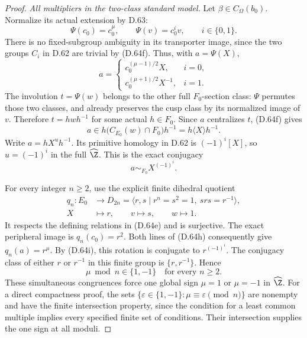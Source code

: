\begin{proof}
\emph{All multipliers in the two-class standard model.}
Let $\beta\in C_\Omega(b_0)$.
Normalize its actual extension by D.63:
\[
        \Psi(c_0)=c_0^\mu,\qquad
        \Psi(v)=c_0^iv,\qquad i\in\{0,1\}.
\]
There is no fixed-subgroup ambiguity in its
transporter image, since the two groups $C_i$
in D.62 are trivial by (D.64f).
Thus, with $a=\Psi(X)$,
\[
       a=
       \begin{cases}
         c_0^{(\mu-1)/2}X,&i=0,\\
         c_0^{(\mu+1)/2}X^{-1},&i=1.
       \end{cases}                                          \tag{D.64h}
\]
The involution $t=\Psi(w)$ belongs to the other
full $F_0$-section class: $\Psi$ permutes those
two classes, and already preserves the cusp
class by its normalized image of $v$.
Therefore $t=hwh^{-1}$ for some actual $h\in F_0$.
Since $a$ centralizes $t$, (D.64f) gives
\[
 a\in h\bigl(C_{E_0}(w)\cap F_0\bigr)h^{-1}
       =h\langle X\rangle h^{-1}.
 \]
Write $a=hX^u h^{-1}$.
Its primitive homology in D.62 is $(-1)^i[X]$,
so $u=(-1)^i$ in the full $\widehat\Z$.
This is the exact conjugacy
\[
                       a\sim_{F_0}X^{(-1)^i}.                \tag{D.64i}
\]

For every integer $n\geq2$, use the explicit
finite dihedral quotient
\[
 \begin{split}
 q_n:E_0&\longrightarrow
       D_{2n}=\langle r,s\mid r^n=s^2=1,\ srs=r^{-1}\rangle,\\
       X&\longmapsto r,\qquad v\longmapsto s,\qquad
       w\longmapsto1 .
 \end{split}                                                  \tag{D.64j}
\]
It respects the defining relations in (D.64e)
and is surjective.
The exact peripheral image is $q_n(c_0)=r^2$.
Both lines of (D.64h) consequently give
$q_n(a)=r^\mu$.
By (D.64i), this rotation is conjugate to
$r^{(-1)^i}$.
The conjugacy class of either $r$ or $r^{-1}$
in this finite group is $\{r,r^{-1}\}$.
Hence
\[
                  \mu\bmod n\in\{1,-1\}
                       \quad\text{for every }n\geq2.
                                                               \tag{D.64k}
\]
These simultaneous congruences force one global
sign $\mu=1$ or $\mu=-1$ in $\widehat\Z$.
For a direct compactness proof, the sets
$\{\varepsilon\in\{1,-1\}:\mu\equiv\varepsilon
\pmod n\}$ are nonempty and have the finite
intersection property, since the condition for
a least common multiple implies every specified
finite set of conditions.
Their intersection supplies the one sign at
all moduli.


\end{proof}
